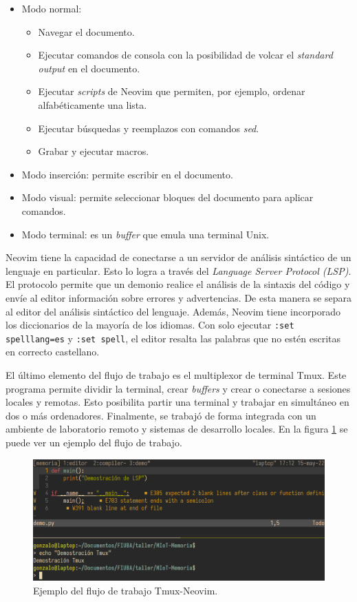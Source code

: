 \begin{itemize}
    \item Modo normal:
        \begin{itemize}
            \item Navegar el documento.
            \item Ejecutar comandos de consola con la posibilidad de volcar el \emph{standard output} en el documento.
            \item Ejecutar \emph{scripts} de Neovim que permiten, por ejemplo, ordenar alfabéticamente una lista.
            \item Ejecutar búsquedas y reemplazos con comandos \emph{sed}.
            \item Grabar y ejecutar macros.
        \end{itemize}
    \item Modo inserción: permite escribir en el documento.
    \item Modo visual: permite seleccionar bloques del documento para aplicar comandos.
    \item Modo terminal: es un \emph{buffer} que emula una terminal Unix.
\end{itemize}

Neovim tiene la capacidad de conectarse a un servidor de análisis sintáctico de un lenguaje en particular.
Esto lo logra a través del \emph{Language Server Protocol (LSP)}.
El protocolo permite que un demonio realice el análisis de la sintaxis del código y envíe al editor información sobre errores y advertencias.
De esta manera se separa al editor del análisis sintáctico del lenguaje.
Además, Neovim tiene incorporado los diccionarios de la mayoría de los idiomas. Con solo ejecutar \texttt{:set spelllang=es} y \texttt{:set spell}, el editor resalta las palabras que no estén escritas en correcto castellano.

El último elemento del flujo de trabajo es el multiplexor de terminal Tmux.
Este programa permite dividir la terminal, crear \emph{buffers} y crear o conectarse a sesiones locales y remotas.
Esto posibilita partir una terminal y trabajar en simultáneo en dos o más ordenadores.
Finalmente, se trabajó de forma integrada con un ambiente de laboratorio remoto y sistemas de desarrollo locales.
En la figura \ref{fig:nvim} se puede ver un ejemplo del flujo de trabajo.

\begin{figure}[htbp]
	\centering
	\includegraphics[width=\textwidth]{./Figures/nvimtmux.png}
    \caption{Ejemplo del flujo de trabajo Tmux-Neovim.}
	\label{fig:nvim}
\end{figure}

